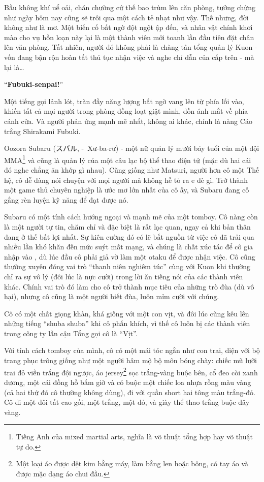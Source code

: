 \documentclass[../main.tex]{subfiles}
\begin{document}

Bầu không khí uể oải, chán chường cứ thế bao trùm lên căn phòng, tưởng chừng như ngày hôm nay cũng sẽ trôi qua một cách tẻ nhạt như vậy. Thế nhưng, đời không như là mơ. Một biến cố bất ngờ đột ngột ập đến, và nhân vật chính khơi mào cho vụ hỗn loạn này lại là một thành viên mới toanh lần đầu tiên đặt chân lên văn phòng. Tất nhiên, người đó không phải là chàng tân tổng quản lý Kuon - vốn đang bận rộn hoàn tất thủ tục nhận việc và nghe chỉ dẫn của cấp trên - mà lại là\dots

``\textbf{Fubuki-senpai!}''

Một tiếng gọi lảnh lót, tràn đầy năng lượng bất ngờ vang lên từ phía lối vào, khiến tất cả mọi người trong phòng đồng loạt giật mình, dồn ánh mắt về phía cánh cửa. Và người phản ứng mạnh mẽ nhất, không ai khác, chính là nàng Cáo trắng Shirakami Fubuki.

\chrint

Oozora Subaru (スバル, -\ Xư-ba-rư) - một nữ quản lý mười bảy tuổi của một đội MMA\footnote{Tiếng Anh của mixed martial arts, nghĩa là võ thuật tổng hợp hay võ thuật tự do.} và cũng là quản lý của một câu lạc bộ thể thao điện tử (mặc dù hai cái đó nghe chẳng ăn khớp gì nhau). Cũng giống như Matsuri, người hơn cô một Thế hệ, cô dễ dàng nói chuyện với mọi người mà không hề tỏ ra e dè gì. Trở thành một game thủ chuyên nghiệp là ước mơ lớn nhất của cô ấy, và Subaru đang cố gắng rèn luyện kỹ năng để đạt được nó.

Subaru có một tính cách hướng ngoại và mạnh mẽ của một tomboy. Cô nàng còn là một người tự tin, chăm chỉ và đặc biệt là rất lạc quan, ngay cả khi bản thân đang ở thế bất lợi nhất. Sự kiên cường đó có lẽ bắt nguồn từ việc cô đã trải qua nhiều lần khó khăn đến mức suýt mất mạng, và chúng là chất xúc tác để cô gia nhập vào \hll, dù lúc đầu cô phải giả vờ làm một otaku để được nhận việc. Cô cũng thường xuyên đóng vai trò ``thanh niên nghiêm túc'' cùng với Kuon khi thường chỉ ra sự vô lý (đôi lúc là nực cười) trong lời ăn tiếng nói của các thành viên khác. Chính vai trò đó làm cho cô trở thành mục tiêu của những trò đùa (dù vô hại), nhưng cô cũng là một người biết đùa, luôn mỉm cười với chúng.

Cô có một chất giọng khàn, khá giống với một con vịt, và đôi lúc cũng kêu lên những tiếng ``shuba shuba'' khi cô phấn khích, vì thế cô luôn bị các thành viên trong công ty lẫn cậu Tổng gọi cô là ``Vịt''.

Với tính cách tomboy của mình, cô có một mái tóc ngắn như con trai, diện với bộ trang phục trông giống như một người hâm mộ bộ môn bóng chày: chiếc mũ lưỡi trai đỏ viền trắng đội ngược, áo jersey\footnote{Một loại áo được dệt kim bằng máy, làm bằng len hoặc bông, có tay áo và được mặc dạng áo chui đầu.} sọc trắng-vàng buộc bên, cổ đeo còi xanh dương, một cái đồng hồ bấm giờ và có buộc một chiếc loa nhựa rỗng màu vàng (cả hai thứ đó cô thường không dùng), đi với quần short hai tông màu trắng-đỏ. Cô đi một đôi tất cao gối, một trắng, một đỏ, và giày thể thao trắng buộc dây vàng.
\end{document}
